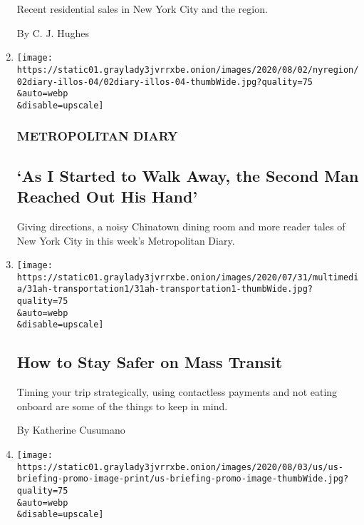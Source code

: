 \begin{enumerate}
  Recent residential sales in New York City and the region.

  By C. J. Hughes
\item
  \href{/2020/08/02/nyregion/metropolitan-diary.html}{}

  \texttt{[image: https://static01.graylady3jvrrxbe.onion/images/2020/08/02/nyregion/02diary-illos-04/02diary-illos-04-thumbWide.jpg?quality=75\\\&auto=webp\\\&disable=upscale]}

  \hypertarget{metropolitan-diary}{%
  \subsubsection{METROPOLITAN DIARY}\label{metropolitan-diary}}

  \hypertarget{as-i-started-to-walk-away-the-second-man-reached-out-his-hand}{%
  \subsection{`As I Started to Walk Away, the Second Man Reached Out His
  Hand'}\label{as-i-started-to-walk-away-the-second-man-reached-out-his-hand}}

  Giving directions, a noisy Chinatown dining room and more reader tales
  of New York City in this week's Metropolitan Diary.
\item
  \href{/2020/08/01/at-home/coronavirus-public-transportation-subway.html}{}

  \texttt{[image: https://static01.graylady3jvrrxbe.onion/images/2020/07/31/multimedia/31ah-transportation1/31ah-transportation1-thumbWide.jpg?quality=75\\\&auto=webp\\\&disable=upscale]}

  \hypertarget{how-to-stay-safer-on-mass-transit}{%
  \subsection{How to Stay Safer on Mass
  Transit}\label{how-to-stay-safer-on-mass-transit}}

  Timing your trip strategically, using contactless payments and not
  eating onboard are some of the things to keep in mind.

  By Katherine Cusumano
\item
  \href{/2020/08/01/world/coronavirus-covid-19.html}{}

  \texttt{[image: https://static01.graylady3jvrrxbe.onion/images/2020/08/03/us/us-briefing-promo-image-print/us-briefing-promo-image-thumbWide.jpg?quality=75\\\&auto=webp\\\&disable=upscale]}


\end{enumerate}
